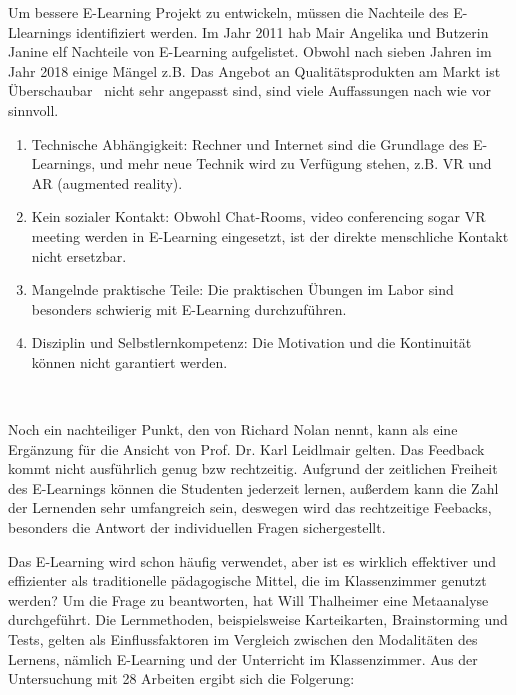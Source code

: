 Um bessere E-Learning Projekt zu entwickeln, müssen die Nachteile des E-Llearnings identifiziert werden. Im Jahr 2011 hab Mair Angelika und Butzerin Janine \citep{7} elf Nachteile von E-Learning aufgelistet. Obwohl nach sieben Jahren im Jahr 2018 einige Mängel z.B. \glqq Das Angebot an Qualitätsprodukten am Markt ist Überschaubar \grqq\ nicht sehr angepasst sind, sind viele Auffassungen nach wie vor sinnvoll.

\begin{enumerate}
\item Technische Abhängigkeit: Rechner und Internet sind die Grundlage des E-Learnings, und mehr neue Technik wird zu Verfügung stehen, z.B. VR und AR (augmented reality).
\item Kein sozialer Kontakt: Obwohl Chat-Rooms, video conferencing sogar VR meeting werden in E-Learning eingesetzt, ist der direkte menschliche Kontakt nicht ersetzbar.
\item Mangelnde praktische Teile: Die praktischen Übungen im Labor sind besonders schwierig mit E-Learning durchzuführen.
\item Disziplin und Selbstlernkompetenz: Die Motivation und die Kontinuität können nicht garantiert werden.
\end{enumerate}\

Noch ein nachteiliger Punkt, den von Richard Nolan \citep{5} nennt, kann als eine Ergänzung für die Ansicht von Prof. Dr. Karl Leidlmair gelten. Das Feedback kommt nicht ausführlich genug bzw rechtzeitig. Aufgrund der zeitlichen Freiheit des E-Learnings können die Studenten jederzeit lernen, außerdem kann die Zahl der Lernenden sehr umfangreich sein, deswegen wird das rechtzeitige Feebacks, besonders die Antwort der individuellen Fragen sichergestellt.

Das E-Learning wird schon häufig verwendet, aber ist es wirklich effektiver und effizienter als traditionelle pädagogische Mittel, die im Klassenzimmer genutzt werden? Um die Frage zu beantworten, hat Will Thalheimer \citep{8} eine Metaanalyse durchgeführt. Die Lernmethoden, beispielsweise Karteikarten, Brainstorming und Tests, gelten als Einflussfaktoren im Vergleich zwischen den Modalitäten des Lernens, nämlich E-Learning und der Unterricht im Klassenzimmer. Aus der Untersuchung mit 28 Arbeiten ergibt sich die Folgerung:

